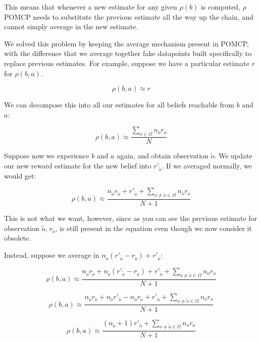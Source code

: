 This means that whenever a new estimate for any given $\rho(b)$ is computed, $\rho$POMCP needs to
substitute the previous estimate all the way up the chain, and cannot simply average in the new
estimate.

We solved this problem by keeping the average mechanism present in POMCP, with the difference that
we average together fake datapoints built specifically to replace previous estimates. For
example, suppose we have a particular estimate $r$ for $\rho(b, a)$.

%

\[ \rho(b,a) \approx r \]

We can decompose this into all our estimates for all beliefs reachable from $b$ and $a$:

\[ \rho(b,a) \approx \frac{\sum_{o\in\Omega} n_o r_o}{N} \]

Suppose now we experience $b$ and $a$ again, and obtain observation $\tilde{o}$. We update our new
reward estimate for the new belief into $r'_{\tilde{o}}$. If we averaged normally, we would get:

\[ \rho(b,a) \approx \frac{ n_{\tilde{o}} r_{\tilde{o}} + r'_{\tilde{o}} +
\sum_{o \neq \tilde{o} \in \Omega} n_o r_o}{N+1} \]

This is not what we want, however, since as you can see the previous estimate for observation
$\tilde{o}$, $r_{\tilde{o}}$, is still present in the equation even though we now consider it
obsolete.

Instead, suppose we average in $n_{\tilde{o}}(r'_{\tilde{o}} - r_{\tilde{o}}) + r'_{\tilde{o}}$:

\[ \rho(b,a) \approx \frac{ n_{\tilde{o}} r_{\tilde{o}} + n_{\tilde{o}}(r'_{\tilde{o}} -
r_{\tilde{o}}) + r'_{\tilde{o}} +
\sum_{o \neq \tilde{o} \in \Omega} n_o r_o}{N+1} \]

\[ \rho(b,a) \approx \frac{ n_{\tilde{o}} r_{\tilde{o}} + n_{\tilde{o}}r'_{\tilde{o}} -
        n_{\tilde{o}} r_{\tilde{o}} + r'_{\tilde{o}} +
\sum_{o \neq \tilde{o} \in \Omega} n_o r_o}{N+1} \]

\[ \rho(b,a) \approx \frac{ ( n_{\tilde{o}}+1) r'_{\tilde{o}} +
\sum_{o \neq \tilde{o} \in \Omega} n_o r_o}{N+1} \]

